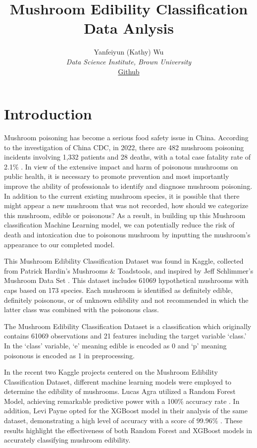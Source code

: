 \documentclass{article}
\title{Mushroom Edibility Classification Data Anlysis}
\author{Yanfeiyun (Kathy) Wu\\
\textit{Data Science Institute, Brown University}\\
\href{https://github.com/kathywu1201/Mushroom_Edibility_Classification_ML_Project}{Github}}
\begin{document}
\maketitle

\section{Introduction}

\hspace{0.5cm} Mushroom poisoning has become a serious food safety issue in China. According to the investigation of China CDC, in 2022, there are 482 mushroom poisoning incidents involving 1,332 patients and 28 deaths, with a total case fatality rate of 2.1\% \cite{Li et al.}. In view of the extensive impact and harm of poisonous mushrooms on public health, it is necessary to promote prevention and most importantly improve the ability of professionals to identify and diagnose mushroom poisoning. In addition to the current existing mushroom species, it is possible that there might appear a new mushroom that was not recorded, how should we categorize this mushroom, edible or poisonous? As a result, in building up this Mushroom classification Machine Learning model, we can potentially reduce the risk of death and intoxication due to poisonous mushroom by inputting the mushroom’s appearance to our completed model.

This Mushroom Edibility Classification Dataset \cite{Zohaib} was found in Kaggle, collected from Patrick Hardin’s Mushrooms \& Toadstools, and inspired by Jeff Schlimmer’s Mushroom Data Set . This dataset includes 61069 hypothetical mushrooms with caps based on 173 species. Each mushroom is identified as definitely edible, definitely poisonous, or of unknown edibility and not recommended in which the latter class was combined with the poisonous class.

The Mushroom Edibility Classification Dataset is a classification which originally contains 61069 observations and 21 features including the target variable ‘class.’ In the ‘class’ variable, ‘e’ meaning edible is encoded as 0 and ‘p’ meaning poisonous is encoded as 1 in preprocessing. 

In the recent two Kaggle projects centered on the Mushroom Edibility Classification Dataset, different machine learning models were employed to determine the edibility of mushrooms. Lucas Agra utilized a Random Forest Model, achieving remarkable predictive power with a 100\% accuracy rate \cite{Agra}. In addition, Levi Payne opted for the XGBoost model in their analysis of the same dataset, demonstrating a high level of accuracy with a score of 99.96\% \cite{Payne}. These results highlight the effectiveness of both Random Forest and XGBoost models in accurately classifying mushroom edibility.
\end{document}
